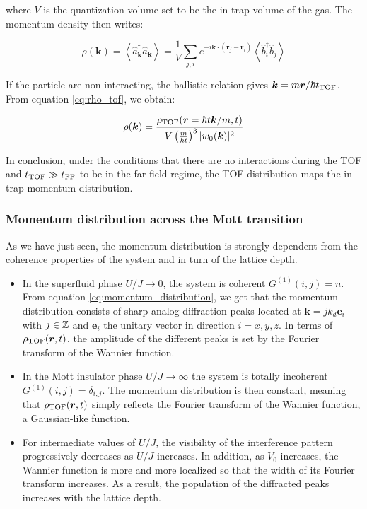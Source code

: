 \noindent where $V$ is the quantization volume set to be the in-trap volume of the gas. The momentum density then writes:

\begin{equation}
    \rho(\bm{k})=\left\langle\hat{a}^{\dagger}_{\bm{k}} \hat{a}_{\bm{k}}\right\rangle=\frac{1}{V} \sum_{j, i} e^{-i \bm{k} \cdot\left(\bm{r}_{j}-\bm{r}_{i}\right)}\left\langle\hat{b}_{i}^{\dagger} \hat{b}_{j}\right\rangle
    \label{eq:momentum_distribution}
\end{equation}

\noindent If the particle are non-interacting, the ballistic relation gives $\bm{k} = m \bm{r}/\hbar t_{\rm{TOF}}$. From equation \ref{eq:rho_tof}, we obtain:

\begin{equation}
    \rho(\bm{k}) = \frac{\rho_{\rm{TOF}}(\bm{r}=\hbar t\bm{k}/m,t)}{V  \left(\frac{m}{\hbar t} \right)^3 |w_0(\bm{k})|^2}
\end{equation}

In conclusion, under the conditions that there are no interactions during the TOF and $t_{\rm{TOF}} \gg t_{\rm{FF}}$ to be in the far-field regime, the TOF distribution maps the in-trap momentum distribution. 

\subsubsection{Momentum distribution across the Mott transition}

As we have just seen, the momentum distribution is strongly dependent from the coherence properties of the system and in turn of the lattice depth.

\begin{itemize}
    \item In the superfluid phase $U/J \to 0$, the system is coherent $G^{(1)}(i,j) = \bar{n}$. From equation \ref{eq:momentum_distribution}, we get that the momentum distribution consists of sharp analog diffraction peaks located at $\bm{k} = j k_d \bm{e}_i$ with $j \in \mathbb{Z}$ and $\bm{e}_i$ the unitary vector in direction $i=x,y,z$. In terms of $\rho_{\rm{TOF}}(\bm{r},t)$, the amplitude of the different peaks is set by the Fourier transform of the Wannier function. 
    
    \item In the Mott insulator phase $U/J \to \infty$ the system is totally incoherent $G^{(1)}(i,j) = \delta_{i,j}$. The momentum distribution is then constant, meaning that $\rho_{\rm{TOF}}(\bm{r},t)$ simply reflects the Fourier transform of the Wannier function, \ie a Gaussian-like function.
    
    \item For intermediate values of $U/J$, the visibility of the interference pattern progressively decreases as $U/J$ increases. In addition, as $V_0$ increases, the Wannier function is more and more localized so that the width of its Fourier transform increases. As a result, the population of the diffracted peaks increases with the lattice depth.
\end{itemize}

